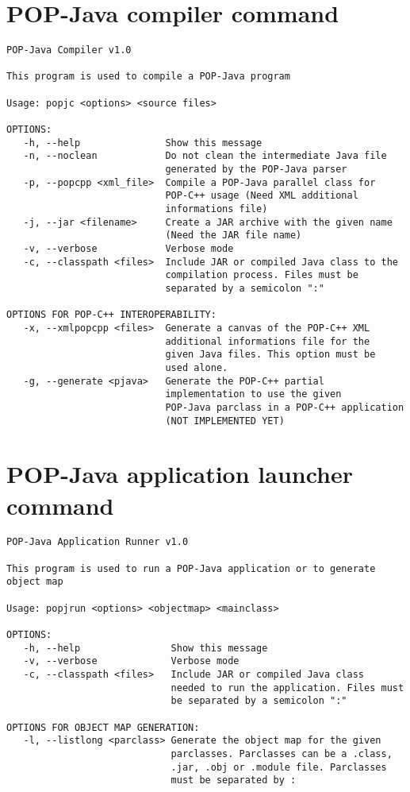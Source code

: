 \section{POP-Java compiler command}
\label{popjc_help}
\begin{lstlisting}
POP-Java Compiler v1.0

This program is used to compile a POP-Java program

Usage: popjc <options> <source files>

OPTIONS:
   -h, --help               Show this message
   -n, --noclean            Do not clean the intermediate Java file 
                            generated by the POP-Java parser
   -p, --popcpp <xml_file>  Compile a POP-Java parallel class for 
                            POP-C++ usage (Need XML additional 
                            informations file)
   -j, --jar <filename>     Create a JAR archive with the given name 
                            (Need the JAR file name)       
   -v, --verbose            Verbose mode
   -c, --classpath <files>  Include JAR or compiled Java class to the 
                            compilation process. Files must be 
                            separated by a semicolon ":"

OPTIONS FOR POP-C++ INTEROPERABILITY:
   -x, --xmlpopcpp <files>  Generate a canvas of the POP-C++ XML 
                            additional informations file for the 
                            given Java files. This option must be 
                            used alone.
   -g, --generate <pjava>   Generate the POP-C++ partial 
                            implementation to use the given 
                            POP-Java parclass in a POP-C++ application 
                            (NOT IMPLEMENTED YET)
\end{lstlisting}

\pagebreak
\section{POP-Java application launcher command}
\begin{lstlisting}
POP-Java Application Runner v1.0

This program is used to run a POP-Java application or to generate 
object map

Usage: popjrun <options> <objectmap> <mainclass>

OPTIONS:
   -h, --help                Show this message
   -v, --verbose             Verbose mode
   -c, --classpath <files>   Include JAR or compiled Java class 
                             needed to run the application. Files must 
                             be separated by a semicolon ":"

OPTIONS FOR OBJECT MAP GENERATION:
   -l, --listlong <parclass> Generate the object map for the given 
                             parclasses. Parclasses can be a .class, 
                             .jar, .obj or .module file. Parclasses 
                             must be separated by : 


\end{lstlisting}
